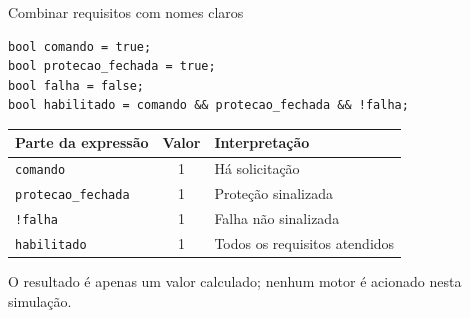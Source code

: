 \begin{frame}[fragile]{Combinar requisitos com nomes claros}
\begin{lstlisting}
bool comando = true;
bool protecao_fechada = true;
bool falha = false;
bool habilitado = comando && protecao_fechada && !falha;
\end{lstlisting}
\begin{center}
\begin{tabular}{lcl}
\toprule
Parte da expressão & Valor & Interpretação \\
\midrule
\texttt{comando} & 1 & Há solicitação \\
\texttt{protecao\_fechada} & 1 & Proteção sinalizada \\
\texttt{!falha} & 1 & Falha não sinalizada \\
\texttt{habilitado} & 1 & Todos os requisitos atendidos \\
\bottomrule
\end{tabular}
\end{center}
\small O resultado é apenas um valor calculado; nenhum motor é acionado nesta simulação.
\end{frame}
